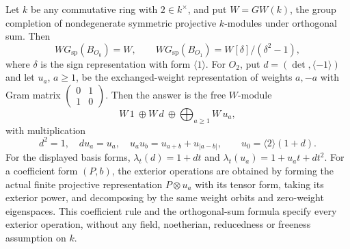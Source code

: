 \begin{proposition}
\label{C:BO_lowrank_base}
Let $k$ be any commutative ring with $2\in k^\times$, and put
$W=GW(k)$, the group completion of nondegenerate symmetric projective
$k$-modules under orthogonal sum. Then
\[
 WG_{\mathrm{sp}}(B_{O_0})=W,\qquad
 WG_{\mathrm{sp}}(B_{O_1})=W[\delta]/(\delta^2-1),
\]
where $\delta$ is the sign representation with form $\langle1\rangle$.
For $O_2$, put $d=(\det,\langle-1\rangle)$ and let $u_a$, $a\geq1$,
be the exchanged-weight representation of weights $a,-a$ with Gram
matrix $\left(\begin{smallmatrix}0&1\\1&0\end{smallmatrix}\right)$.
Then the answer is the free $W$-module
\[
 W\,1\ \oplus W\,d\ \oplus\bigoplus_{a\geq1}W\,u_a,
\]
with multiplication
\[
 d^2=1,\quad du_a=u_a,\quad
 u_a u_b=u_{a+b}+u_{|a-b|},\qquad
 u_0=\langle2\rangle(1+d).                             \tag{C.3.14}
\]
For the displayed basis forms,
$\lambda_t(d)=1+dt$ and $\lambda_t(u_a)=1+u_at+dt^2$.
For a coefficient form $(P,b)$, the exterior operations are obtained by
forming the actual finite projective representation $P\otimes u_a$
with its tensor form, taking its exterior power, and decomposing by the
same weight orbits and zero-weight eigenspaces. This coefficient rule
and the orthogonal-sum formula specify every exterior operation,
without any field, noetherian, reducedness or freeness assumption on $k$.
\end{proposition}
